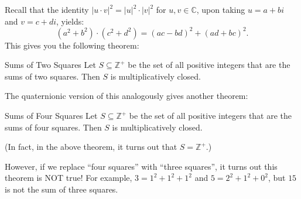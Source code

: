 Recall that the identity $|u \cdot v|^2 = |u|^2 \cdot |v|^2$ for $u, v \in \mathbb{C}$, upon taking $u = a + bi$ and $v = c + di$, yields:
\[ (a^2 + b^2) \cdot (c^2 + d^2) = (ac - bd)^2 + (ad + bc)^2. \]
This gives you the following theorem:

\begin{theorem}{Sums of Two Squares}
    Let $S \subseteq \mathbb{Z}^+$ be the set of all positive integers that are the sums of two squares.  Then $S$ is multiplicatively closed.
\end{theorem}

The quaternionic version of this analogously gives another theorem:

\begin{theorem}{Sums of Four Squares}
    Let $S \subseteq \mathbb{Z}^+$ be the set of all positive integers that are the sums of four squares.  Then $S$ is multiplicatively closed.
\end{theorem}

(In fact, in the above theorem, it turns out that $S = \mathbb{Z}^+$.)

However, if we replace ``four squares'' with ``three squares'', it turns out this theorem is NOT true!  For example, $3 = 1^2 + 1^2 + 1^2$ and $5 = 2^2 + 1^2 + 0^2$, but $15$ is not the sum of three squares.

